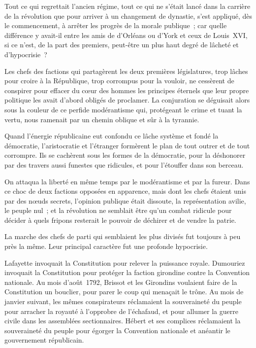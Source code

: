\documentclass[french,twoside]{book} %
\begin{document}
Tout ce qui regrettait l’ancien régime, tout ce qui ne s’était lancé dans la carrière de la révolution que pour arriver à un changement de dynastie, s’est appliqué, dès le commencement, à arrêter les progrès de la morale publique ; car quelle différence y avait-il entre les amis de d’Orléans ou d’York et ceux de Louis XVI, si ce n’est, de la part des premiers, peut-être un plus haut degré de lâcheté et d’hypocrisie ?\par
Les chefs des factions qui partagèrent les deux premières législatures, trop lâches pour croire à la République, trop corrompus pour la vouloir, ne cessèrent de conspirer pour effacer du cœur des hommes les principes éternels que leur propre politique les avait d’abord obligés de proclamer. La conjuration se déguisait alors sous la couleur de ce perfide modérantisme qui, protégeant le crime et tuant la vertu, nous ramenait par un chemin oblique et sûr à la tyrannie.\par
Quand l’énergie républicaine eut confondu ce lâche système et fondé la démocratie, l’aristocratie et l’étranger formèrent le plan de tout outrer et de tout corrompre. Ils se cachèrent sous les formes de la démocratie, pour la déshonorer par des travers aussi funestes que ridicules, et pour l’étouffer dans son berceau.\par
On attaqua la liberté en même temps par le modérantisme et par la fureur. Dans ce choc de deux factions opposées en apparence, mais dont les chefs étaient unis par des nœuds secrets, l’opinion publique était dissoute, la représentation avilie, le peuple nul ; et la révolution ne semblait être qu’un combat ridicule pour décider à quels fripons resterait le pouvoir de déchirer et de vendre la patrie.\par
La marche des chefs de parti qui semblaient les plus divisés fut toujours à peu près la même. Leur principal caractère fut une profonde hypocrisie.\par
Lafayette invoquait la Constitution pour relever la puissance royale. Dumouriez invoquait la Constitution pour protéger la faction girondine contre la Convention nationale. Au mois d’août 1792, Brissot et les Girondins voulaient faire de la Constitution un bouclier, pour parer le coup qui menaçait le trône. Au mois de janvier suivant, les mêmes conspirateurs réclamaient la souveraineté du peuple pour arracher la royauté à l’opprobre de l’échafaud, et pour allumer la guerre civile dans les assemblées sectionnaires. Hébert et ses complices réclamaient la souveraineté du peuple pour égorger la Convention nationale et anéantir le gouvernement républicain.\par
\end{document}
